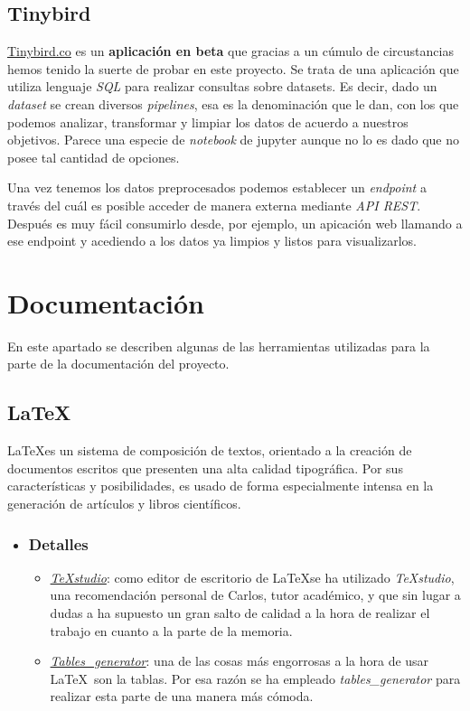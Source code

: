  \subsection{Tinybird}
\href{https://tinybird.co//}{Tinybird.co} es un \textbf{aplicación en beta} que gracias a un cúmulo de circustancias hemos tenido la suerte de probar en este proyecto. Se trata de una aplicación que utiliza lenguaje \textit{SQL} para realizar consultas sobre datasets. Es decir, dado un \textit{dataset} se crean diversos \textit{pipelines}, esa es la denominación que le dan, con los que podemos analizar, transformar y limpiar los datos de acuerdo a nuestros objetivos. Parece una especie de \textit{notebook} de jupyter aunque no lo es dado que no posee tal cantidad de opciones. 

Una vez tenemos los datos preprocesados podemos establecer un \textit{endpoint} a través del cuál es posible acceder de manera externa mediante \textit{API REST}. Después es muy fácil consumirlo desde, por ejemplo, un apicación web llamando a ese endpoint y acediendo a los datos ya limpios y listos para visualizarlos. 

\section{Documentación}\label{docs}
En este apartado se describen algunas de las herramientas utilizadas para la parte de la documentación del proyecto.

 \subsection{La\TeX}\label{docs_latex}
  La\TeX es un sistema de composición de textos, orientado a la creación de documentos escritos que presenten una alta calidad tipográfica. Por sus características y posibilidades, es usado de forma especialmente intensa en la generación de artículos y libros científicos. 
  
   \begin{itemize}
  	\item \subsubsection{Detalles}
  	\begin{itemize}
  		\item \href{https://www.texstudio.org}{\textit{TeXstudio}}: como editor de escritorio de La\TeX se ha utilizado \textit{TeXstudio}, una recomendación personal de Carlos, tutor académico, y que sin lugar a dudas a ha supuesto un gran salto de calidad a la hora de realizar el trabajo en cuanto a la parte de la memoria.
  		\item \href{http://www.tablesgenerator.com/latex_tables}{\textit{Tables\_generator}}: una de las cosas más engorrosas a la hora de usar La\TeX\  son la tablas. Por esa razón se ha empleado \textit{tables\_generator} para realizar esta parte de una manera más cómoda. 
  	\end{itemize}
  \end{itemize}
  
